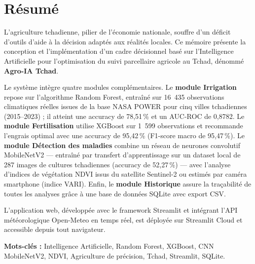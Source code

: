 
\chapter*{Résumé}
\thispagestyle{plain}

L'agriculture tchadienne, pilier de l'économie nationale, souffre
d'un déficit d'outils d'aide à la décision adaptés aux réalités
locales. Ce mémoire présente la conception et l'implémentation
d'un cadre décisionnel basé sur l'Intelligence Artificielle pour
l'optimisation du suivi parcellaire agricole au Tchad, dénommé
\textbf{Agro-IA Tchad}.

\medskip

Le système intègre quatre modules complémentaires. Le
\textbf{module Irrigation} repose sur l'algorithme Random Forest,
entraîné sur 16~435 observations climatiques réelles issues de la
base NASA POWER pour cinq villes tchadiennes (2015--2023) ; il
atteint une accuracy de 78,51\,\% et un AUC-ROC de 0,8782. Le
\textbf{module Fertilisation} utilise XGBoost sur 1~599
observations et recommande l'engrais optimal avec une accuracy de
95,42\,\% (F1-score macro de 95,47\,\%). Le \textbf{module
	Détection des maladies} combine un réseau de neurones convolutif
MobileNetV2 --- entraîné par transfert d'apprentissage sur un
dataset local de 287 images de cultures tchadiennes (accuracy de
52,27\,\%) --- avec l'analyse d'indices de végétation NDVI issus
du satellite Sentinel-2 ou estimés par caméra smartphone (indice
VARI). Enfin, le \textbf{module Historique} assure la traçabilité
de toutes les analyses grâce à une base de données SQLite avec
export CSV.

\medskip

L'application web, développée avec le framework Streamlit et
intégrant l'API météorologique Open-Meteo en temps réel, est
déployée sur Streamlit Cloud et accessible depuis tout navigateur.

\medskip

\noindent\textbf{Mots-clés :} Intelligence Artificielle, Random
Forest, XGBoost, CNN MobileNetV2, NDVI, Agriculture de précision,
Tchad, Streamlit, SQLite.

\newpage

